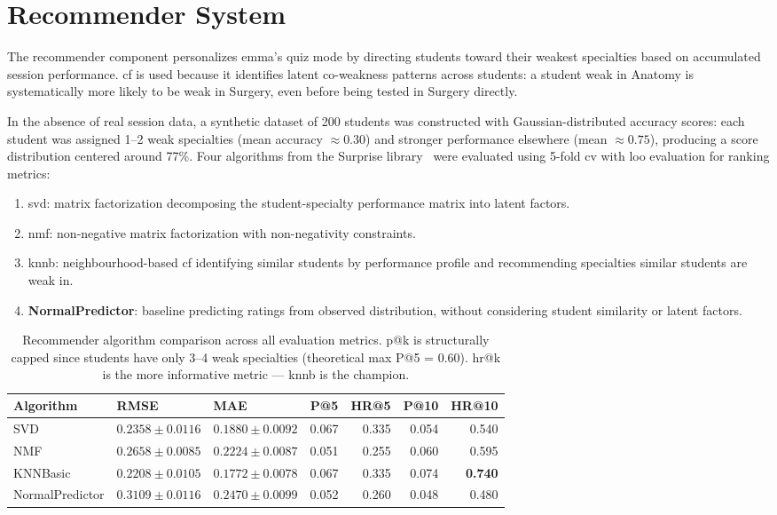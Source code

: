 \section{Recommender System}
\label{sec:crs}

The recommender component personalizes \gls{emma}'s quiz mode by directing students toward their weakest specialties based on accumulated session performance. \gls{cf} is used because it identifies latent co-weakness patterns across students: a student weak in Anatomy is systematically more likely to be weak in Surgery, even before being tested in Surgery directly.

In the absence of real session data, a synthetic dataset of 200 students was constructed with Gaussian-distributed accuracy scores: each student was assigned 1--2 weak specialties (mean accuracy $\approx 0.30$) and stronger performance elsewhere (mean $\approx 0.75$), producing a score distribution centered around 77\%. Four algorithms from the Surprise library~\cite{hug_surprise_2020} were evaluated using 5-fold \gls{cv} with \gls{loo} evaluation for ranking metrics:

\begin{enumerate}
  \item \gls{svd}: matrix factorization decomposing the student-specialty performance matrix into latent factors.
  \item \gls{nmf}: non-negative matrix factorization with non-negativity constraints.
  \item \gls{knnb}: neighbourhood-based \gls{cf} identifying similar students by performance profile and recommending specialties similar students are weak in.
  \item \textbf{NormalPredictor}: baseline predicting ratings from observed distribution, without considering student similarity or latent factors.
\end{enumerate}

\begin{table}
  \caption{Recommender algorithm comparison across all evaluation metrics. \gls{p@k} is structurally capped since students have only 3--4 weak specialties (theoretical max P@5 = 0.60). \gls{hr@k} is the more informative metric --- \gls{knnb} is the champion.}
  \label{tab:crs}
  \begin{tabular}{lllrrrr}
    \toprule
    Algorithm & RMSE & MAE & P@5 & HR@5 & P@10 & HR@10 \\
    \midrule
    SVD             & $0.2358 \pm 0.0116$ & $0.1880 \pm 0.0092$ & 0.067 & 0.335 & 0.054 & 0.540 \\
    NMF             & $0.2658 \pm 0.0085$ & $0.2224 \pm 0.0087$ & 0.051 & 0.255 & 0.060 & 0.595 \\
    KNNBasic        & $0.2208 \pm 0.0105$ & $0.1772 \pm 0.0078$ & 0.067 & 0.335 & 0.074 & \textbf{0.740} \\
    NormalPredictor & $0.3109 \pm 0.0116$ & $0.2470 \pm 0.0099$ & 0.052 & 0.260 & 0.048 & 0.480 \\
    \bottomrule
  \end{tabular}
\end{table}

